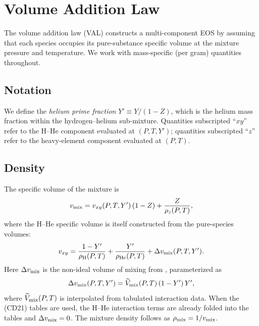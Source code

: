 \documentclass[twocolumn]{aastex701}
\begin{document}
\section{Volume Addition Law}\label{sec:val}

The volume addition law (VAL) constructs a multi-component EOS by assuming that each species occupies its pure-substance specific volume at the mixture pressure and temperature.
We work with mass-specific (per gram) quantities throughout.

\subsection{Notation}\label{sec:notation}

We define the \emph{helium prime fraction} $Y' \equiv Y/(1-Z)$, which is the helium mass fraction within the hydrogen--helium sub-mixture.
Quantities subscripted ``$xy$'' refer to the H--He component evaluated at $(P,T,Y')$; quantities subscripted ``$z$'' refer to the heavy-element component evaluated at $(P,T)$.

\subsection{Density}\label{sec:val_rho}

The specific volume of the mixture is
\begin{equation}\label{eq:val_rho}
    v_{\rm mix} = v_{xy}(P,T,Y')\,(1-Z) + \frac{Z}{\rho_z(P,T)},
\end{equation}
where the H--He specific volume is itself constructed from the pure-species volumes:
\begin{equation}\label{eq:vxy}
    v_{xy} = \frac{1-Y'}{\rho_{\rm H}(P,T)} + \frac{Y'}{\rho_{\rm He}(P,T)} + \Delta v_{\rm mix}(P,T,Y').
\end{equation}
Here $\Delta v_{\rm mix}$ is the non-ideal volume of mixing from \citet{Howard2023a}, parameterized as
\begin{equation}\label{eq:vmix}
    \Delta v_{\rm mix}(P,T,Y') = \widetilde{V}_{\rm mix}(P,T)\,(1-Y')\,Y',
\end{equation}
where $\widetilde{V}_{\rm mix}(P,T)$ is interpolated from tabulated interaction data.
When the \citet{Chabrier2021} (CD21) tables are used, the H--He interaction terms are already folded into the tables and $\Delta v_{\rm mix} = 0$.
The mixture density follows as $\rho_{\rm mix} = 1/v_{\rm mix}$.
\end{document}
